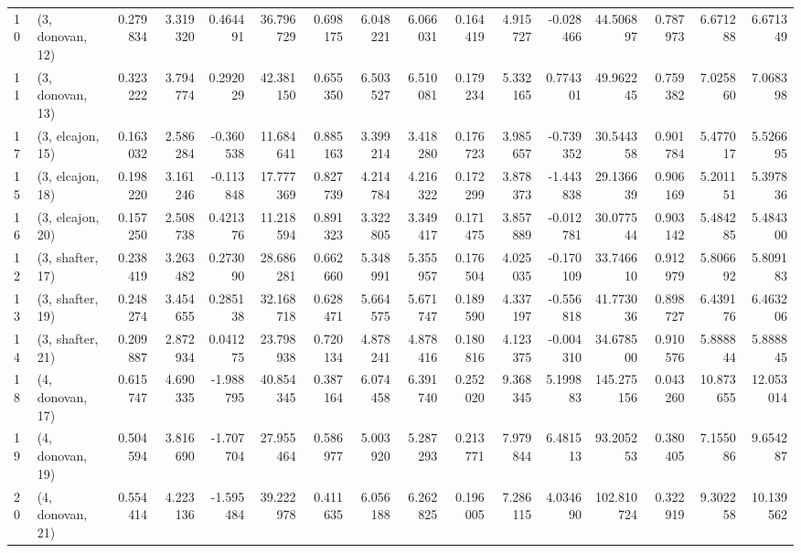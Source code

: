 \begin{tabular}{llrrrrrrrrrrrrrr}
10 &  (3, donovan, 12) &   0.279834 &  3.319320 &  0.464491 &  36.796729 &  0.698175 &   6.048221 &  6.066031 &  0.164419 &  4.915727 & -0.028466 &   44.506897 &  0.787973 &   6.671288 &   6.671349 \\
11 &  (3, donovan, 13) &   0.323222 &  3.794774 &  0.292029 &  42.381150 &  0.655350 &   6.503527 &  6.510081 &  0.179234 &  5.332165 &  0.774301 &   49.962245 &  0.759382 &   7.025860 &   7.068398 \\
17 &  (3, elcajon, 15) &   0.163032 &  2.586284 & -0.360538 &  11.684641 &  0.885163 &   3.399214 &  3.418280 &  0.176723 &  3.985657 & -0.739352 &   30.544358 &  0.901784 &   5.477017 &   5.526695 \\
15 &  (3, elcajon, 18) &   0.198220 &  3.161246 & -0.113848 &  17.777369 &  0.827739 &   4.214784 &  4.216322 &  0.172299 &  3.878373 & -1.443838 &   29.136639 &  0.906169 &   5.201151 &   5.397836 \\
16 &  (3, elcajon, 20) &   0.157250 &  2.508738 &  0.421376 &  11.218594 &  0.891323 &   3.322805 &  3.349417 &  0.171475 &  3.857889 & -0.012781 &   30.077544 &  0.903142 &   5.484285 &   5.484300 \\
12 &  (3, shafter, 17) &   0.238419 &  3.263482 &  0.273090 &  28.686281 &  0.662660 &   5.348991 &  5.355957 &  0.176504 &  4.025035 & -0.170109 &   33.746610 &  0.912979 &   5.806692 &   5.809183 \\
13 &  (3, shafter, 19) &   0.248274 &  3.454655 &  0.285138 &  32.168718 &  0.628471 &   5.664575 &  5.671747 &  0.189590 &  4.337197 & -0.556818 &   41.773036 &  0.898727 &   6.439176 &   6.463206 \\
14 &  (3, shafter, 21) &   0.209887 &  2.872934 &  0.041275 &  23.798938 &  0.720134 &   4.878241 &  4.878416 &  0.180816 &  4.123375 & -0.004310 &   34.678500 &  0.910576 &   5.888844 &   5.888845 \\
18 &  (4, donovan, 17) &   0.615747 &  4.690335 & -1.988795 &  40.854345 &  0.387164 &   6.074458 &  6.391740 &  0.252020 &  9.368345 &  5.199883 &  145.275156 &  0.043260 &  10.873655 &  12.053014 \\
19 &  (4, donovan, 19) &   0.504594 &  3.816690 & -1.707704 &  27.955464 &  0.586977 &   5.003920 &  5.287293 &  0.213771 &  7.979844 &  6.481513 &   93.205253 &  0.380405 &   7.155086 &   9.654287 \\
20 &  (4, donovan, 21) &   0.554414 &  4.223136 & -1.595484 &  39.222978 &  0.411635 &   6.056188 &  6.262825 &  0.196005 &  7.286115 &  4.034690 &  102.810724 &  0.322919 &   9.302258 &  10.139562 \\

\end{tabular}
